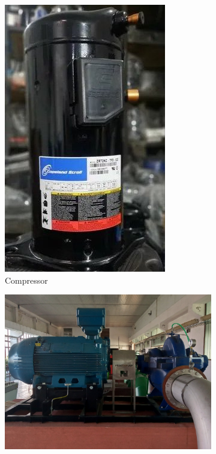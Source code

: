\begin{figure}[ht]
\begin{subfigure}[b]{0.17\textwidth}
        \includegraphics[width=\textwidth]{assets/design/machine-compressor.jpg}
        \caption{\footnotesize Compressor}
        \label{fig:machine:compressor}
    \end{subfigure}
    \hfill
    \begin{subfigure}[b]{0.31\textwidth}
    		\centering
        \includegraphics[width=\textwidth]{assets/design/machine-ksb-pump.jpg}

\end{subfigure}
\end{figure}
